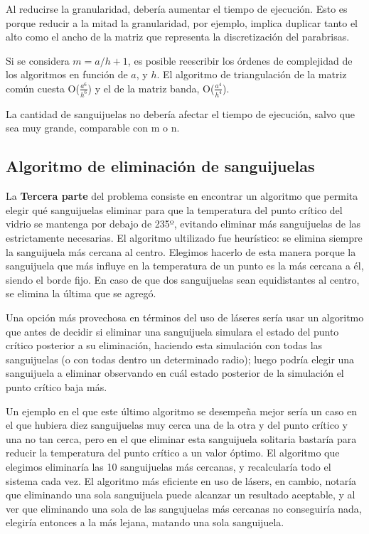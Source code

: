 \documentclass[a4paper]{article}
\begin{document}
Al reducirse la granularidad, debería aumentar el tiempo de ejecución. Esto es porque reducir a la mitad la granularidad, por ejemplo, implica duplicar tanto el alto como el ancho de la matriz que representa la discretización del parabrisas.

Si se considera $m=a/h+1$, es posible reescribir los órdenes de complejidad de los algoritmos en función de $a$, y $h$. El algoritmo de triangulación de la matriz común cuesta O($\frac{a^6}{h^6}$) y el de la matriz banda, O($\frac{a^4}{h^4}$).

La cantidad de sanguijuelas no debería afectar el tiempo de ejecución, salvo que sea muy grande, comparable con m o n. \newline

\subsection{Algoritmo de eliminación de sanguijuelas}

La \textbf{Tercera parte} del problema consiste en encontrar un algoritmo que permita elegir qué sanguijuelas eliminar para que la temperatura del punto crítico del vidrio se mantenga por debajo de 235º, evitando eliminar más sanguijuelas de las estrictamente necesarias. El algoritmo ultilizado fue heurístico: se elimina siempre la sanguijuela más cercana al centro. Elegimos hacerlo de esta manera porque la sanguijuela que más influye en la temperatura de un punto es la más cercana a él, siendo el borde fijo. En caso de que dos sanguijuelas sean equidistantes al centro, se elimina la última que se agregó.

Una opción más provechosa en términos del uso de láseres sería usar un algoritmo que antes de decidir si eliminar una sanguijuela simulara el estado del punto crítico posterior a su eliminación, haciendo esta simulación con todas las sanguijuelas (o con todas dentro un determinado radio); luego podría elegir una sanguijuela a eliminar observando en cuál estado posterior de la simulación el punto crítico baja más.

Un ejemplo en el que este último algoritmo se desempeña mejor sería un caso en el que hubiera diez sanguijuelas muy cerca una de la otra y del punto crítico y una no tan cerca, pero en el que eliminar esta sanguijuela solitaria bastaría para reducir la temperatura del punto crítico a un valor óptimo.
El algoritmo que elegimos eliminaría las 10 sanguijuelas más cercanas, y recalcularía todo el sistema cada vez.
El algoritmo más eficiente en uso de lásers, en cambio, notaría que eliminando una sola sanguijuela puede alcanzar un resultado aceptable, y al ver que eliminando una sola de las sangujuelas más cercanas no conseguiría nada, elegiría entonces a la más lejana, matando una sola sanguijuela.
\end{document}
